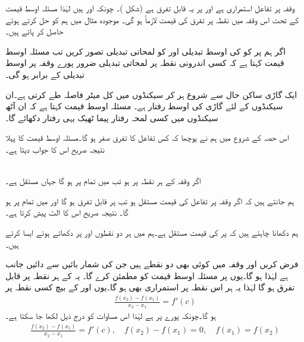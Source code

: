 وقفہ  پر تفاعل  استمراری ہے اور  پر یہ قابل تفرق ہے (شکل )۔ چونکہ  اور  ہیں لہٰذا مسئلہ اوسط قیمت کے تحت اس وقفہ میں نقطہ  پر تفرق  کی قیمت لازماً  ہو گی۔ موجودہ مثال میں ہم  کو حل کرتے ہوئے
  حاصل کر پاتے ہیں۔ 

اگر ہم  پر  کو  کی  اوسط تبدیلی اور  کو لمحاتی تبدیلی تصور کریں تب مسئلہ اوسط قیمت کہتا ہے کہ کسی اندرونی   نقطہ پر لمحاتی تبدیلی ضرور پورے وقفہ پر اوسط تبدیلی کے برابر ہو گی۔

ایک گاڑی ساکن حال سے شروع ہر کر  سیکنڈوں میں کل  میٹر فاصلہ طے کرتی ہے۔ان  سیکنڈوں کے لئے گاڑی کی اوسط رفتار  ہے۔ مسئلہ اوسط قیمت کہتا ہے کہ ان آٹھ سیکنڈوں میں کسی لمحہ رفتار پیما ٹھیک یہی رفتار دکھائے گا۔


اس حصہ کے شروع میں ہم نے پوچھا کہ کس تفاعل کا تفرق صفر ہو گا۔مسئلہ اوسط قیمت کا پہلا نتیجہ صریح اس کا جواب دیتا ہے۔

\\
اگر وقفہ  کے ہر نقطہ پر  ہو تب  میں تمام  پر  ہو گا جہاں  مستقل ہے۔

ہم جانتے ہیں کہ اگر وقفہ  پر تفاعل  کی قیمت مستقل ہو تب  پر  قابل تفرق ہو گا اور  میں تمام  پر  ہو گا۔ نتیجہ صریح اس کا الٹ پیش کرتا ہے۔

ہم دکھانا چاہتے ہیں کہ  پر  کی قیمت مستقل ہے۔ہم  میں ہر دو نقطوں  اور  پر  دکھاتے ہوئے ایسا کرتے ہیں۔

فرض کریں  اور  وقفہ  میں کوئی بھی دو نقطے ہیں جن کی شمار بائیں سے دائیں جانب ہے لہٰذا  ہو گا۔یوں  پر  مسئلہ اوسط قیمت کو مطمئن کرے گا۔ یہ  کے ہر نقطہ پر قابل تفرق ہو گا لہٰذا یہ ہر اس نقطہ پر استمراری بھی ہو گا۔یوں  اور  کے بیچ کسی نقطہ  پر
\begin{align*}
\frac{f(x_2)-f(x_1)}{x_2-x_1}=f'(c)
\end{align*}
ہو گا۔چونکہ پورے  پر  ہے لہٰذا اس مساوات کو درج ذیل لکھا جا سکتا ہے۔
\begin{align*}
\frac{f(x_2)-f(x_1)}{x_2-x_1}=f'(c),\quad f(x_2)-f(x_1)=0,\quad f(x_1)=f(x_2)
\end{align*}

